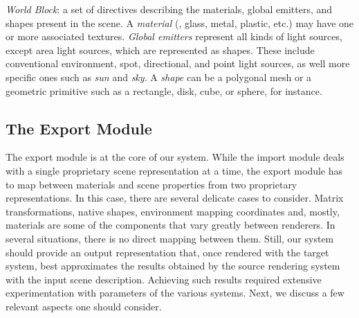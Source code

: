 \noindent \textit{World Block}:
a set of directives describing the materials, global emitters, and shapes present in the scene.
%
A {\it material} (\eg, glass, metal, plastic, etc.) may have one or more associated textures. {\it Global emitters} represent all kinds of light sources, except area light sources, which are represented as shapes. These include conventional environment, spot, directional, and point light sources, as well more specific ones such as {\it sun} and {\it sky}.
%
A {\it shape} can be a polygonal mesh or a geometric primitive such as a rectangle, disk, cube, or sphere, for instance. 



\subsection{The Export Module}

The export module is at the core of our system. While the import module deals with a single proprietary scene representation at a time, the export module has to map between materials and scene properties from two proprietary representations. 
In this case, there are several delicate cases to
consider. Matrix transformations, native shapes, environment mapping coordinates and, mostly, materials are
some of the components that vary greatly between renderers. 
In several situations, there is no direct mapping between them. Still, our system should provide an output representation that, once rendered with the target system, best approximates the results obtained by the source rendering system with the input scene description. 
Achieving such results required extensive experimentation with parameters of the various systems. Next, we discuss a few relevant aspects one should consider.    
  
